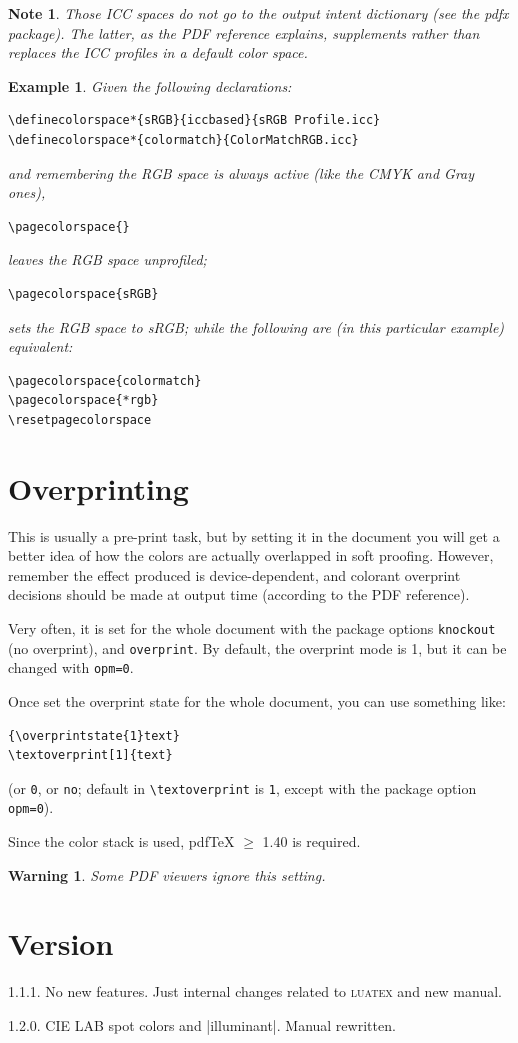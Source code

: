 \documentclass[a4paper]{ltxguide}
\newtheorem{warning}{Warning}
\newtheorem{note}{Note}
\newtheorem{example}{Example}
\begin{document}
\begin{note}
  Those ICC spaces do not go to the output intent dictionary (see
  the \textsf{pdfx} package). The latter, as the PDF reference
  explains, supplements rather than replaces the ICC profiles in a
  default color space.
\end{note}

\begin{example}
  Given the following declarations:
\begin{verbatim}
\definecolorspace*{sRGB}{iccbased}{sRGB Profile.icc}
\definecolorspace*{colormatch}{ColorMatchRGB.icc}
\end{verbatim}
  and remembering the RGB space is always active (like the CMYK and
  Gray ones),
\begin{verbatim}
\pagecolorspace{}
\end{verbatim}
leaves the RGB space unprofiled;
\begin{verbatim}
\pagecolorspace{sRGB}
\end{verbatim}
sets the RGB space to sRGB; while the following are (in this
particular example) equivalent:
\begin{verbatim}
\pagecolorspace{colormatch}
\pagecolorspace{*rgb}
\resetpagecolorspace
\end{verbatim}


\end{example}

\section{Overprinting}

This is usually a pre-print task, but by setting it in the document
you will get a better idea of how the colors are actually overlapped
in soft proofing. However, remember the effect produced is
device-dependent, and colorant overprint decisions should be made at
output time (according to the PDF reference).

Very often, it is set for the whole document with the package options
\verb|knockout| (no overprint), and \verb|overprint|. By default, the
overprint mode is 1, but it can be changed with \verb|opm=0|.

Once set the overprint state for the whole document, you can use
something like:
\begin{verbatim}
{\overprintstate{1}text}
\textoverprint[1]{text}
\end{verbatim}
(or \verb|0|, or \verb|no|; default in \verb|\textoverprint| is
\verb|1|, except with the package option \verb|opm=0|).

Since the color stack is used, pdf\TeX{} $\ge$ 1.40 is required.

\begin{warning}
  Some PDF viewers ignore this setting.
\end{warning}

\section{Version}

1.1.1. No new features. Just internal changes related to
\textsc{luatex} and new manual.

1.2.0. CIE LAB spot colors and |illuminant|. Manual rewritten.
\end{document}
